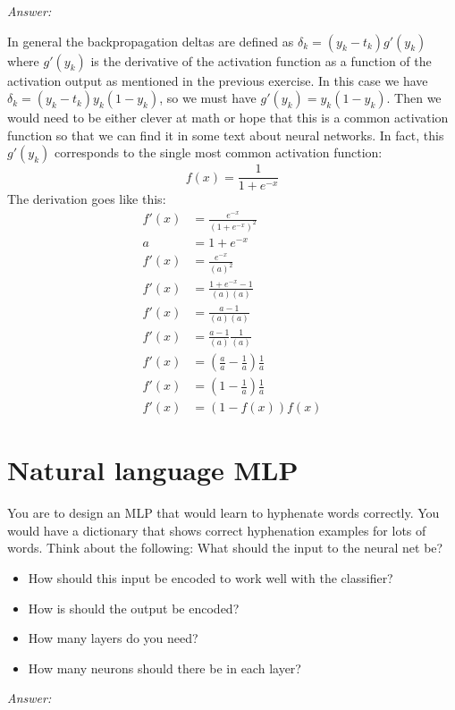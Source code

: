 \noindent\textit{Answer:}

\noindent
In general the backpropagation deltas are defined as \(\delta_k = (y_k - t_k)g'(y_k)\) where \(g'(y_k)\) is the derivative of the activation function as a function of the activation output as mentioned in the previous exercise.
In this case we have \(\delta_k = (y_k-t_k)y_k(1-y_k)\), so we must have \(g'(y_k) = y_k(1-y_k)\).
Then we would need to be either clever at math or hope that this is a common activation function so that we can find it in some text about neural networks.
In fact, this \(g'(y_k)\) corresponds to the single most common activation function:
\begin{equation}
    f(x) = \frac{1}{1+e^{-x}}
\end{equation}
The derivation goes like this:
\begin{align*}
    f'(x) &= \frac{e^{-x}}{(1+e^{-x})^2}\\
        a &= 1+e^{-x}\\
    f'(x) &= \frac{e^{-x}}{(a)^2}\\
    f'(x) &= \frac{1 + e^{-x} - 1}{(a)(a)}\\
    f'(x) &= \frac{a - 1}{(a)(a)}\\
    f'(x) &= \frac{a - 1}{(a)} \frac{1}{(a)}\\
    f'(x) &= (\frac{a}{a} - \frac{1}{a})\frac{1}{a}\\
    f'(x) &= (1 - \frac{1}{a})\frac{1}{a}\\
    f'(x) &= (1 - f(x))f(x)
\end{align*}

\section{Natural language MLP}
You are to design an MLP that would learn to hyphenate words correctly.
You would have a dictionary that shows correct hyphenation examples for lots of words.
Think about the following:
What should the input to the neural net be?
\begin{itemize}
    \item How should this input be encoded to work well with the classifier?
    \item How is should the output be encoded?
    \item How many layers do you need?
    \item How many neurons should there be in each layer?
\end{itemize}

\noindent\textit{Answer:}

